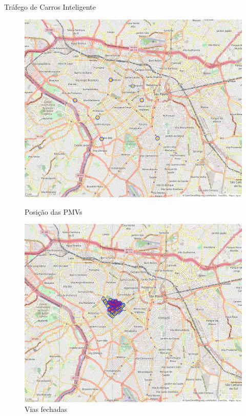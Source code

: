 \documentclass[xcolor={usenames,svgnames,dvipsnames},brazil,english,12pt,aspectratio=149]{beamer}
\begin{document}
\begin{frame}{Tráfego de Carros Inteligente}
     \begin{figure}[ht]
        \begin{minipage}[b]{0.45\linewidth}
            \centering
            \includegraphics[width=\textwidth]{pmvs_locations.png}
            \caption{Posição das PMVs}
        \end{minipage}
        \hspace{0.5cm}
        \begin{minipage}[b]{0.45\linewidth}
            \centering
            \includegraphics[width=\textwidth]{events_edges_map.png}
            \caption{Vias fechadas}
        \end{minipage}
    \end{figure}
\end{frame}
\end{document}
